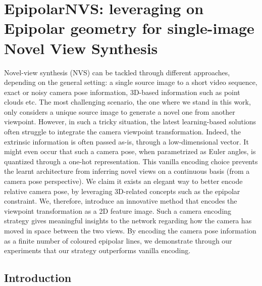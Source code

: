 \chapter{EpipolarNVS: leveraging on Epipolar geometry for single-image Novel View Synthesis} 
\label{chapter:epipolarnvs}


\newcommand{\tableindent}{\,\,\,\,}
\newcommand{\vt}{\mathbf{t}}

\newcommand{\std}{$\pm\,$}
\newcommand{\clf}{\textit{clf}} \newcommand{\gray}[1]{{\color{darkgray}#1}}



Novel-view synthesis (NVS) can be tackled through different approaches, depending on the general setting: a single source image to a short video sequence, exact or noisy camera pose information, 3D-based information such as point clouds etc. The most challenging scenario, the one where we stand in this work, only considers a unique source image to generate a novel one from another viewpoint. However, in such a tricky situation, the latest learning-based solutions often struggle to integrate the camera viewpoint transformation. Indeed, the extrinsic information is often passed as-is, through a low-dimensional vector. It might even occur that such a camera pose, when parametrized as Euler angles,  is quantized through a one-hot representation. This vanilla encoding choice prevents the learnt architecture from inferring novel views on a continuous basis (from a camera pose perspective). We claim it exists an elegant way to better encode relative camera pose, by leveraging 3D-related concepts such as the epipolar constraint. We, therefore, introduce an innovative method that encodes the viewpoint transformation as a 2D feature image. Such a camera encoding strategy gives meaningful insights to the network regarding how the camera has moved in space between the two views. By encoding the camera pose information as a finite number of coloured epipolar lines, we demonstrate through our experiments that our strategy outperforms vanilla encoding. 

\section{Introduction}

